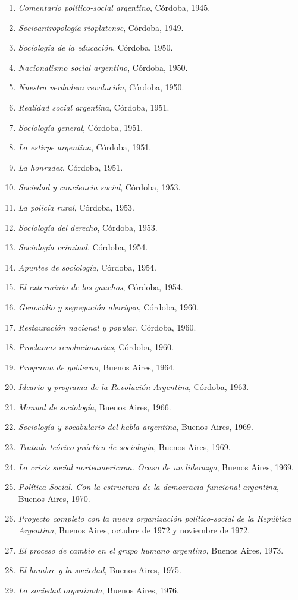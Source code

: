 \begin{enumerate}
\item \emph{Comentario político-social argentino}, Córdoba, 1945.
\item \emph{Socioantropología rioplatense}, Córdoba, 1949.
\item \emph{Sociología de la educación}, Córdoba, 1950.
\item \emph{Nacionalismo social argentino}, Córdoba, 1950.
\item \emph{Nuestra verdadera revolución}, Córdoba, 1950.
\item \emph{Realidad social argentina}, Córdoba, 1951.
\item \emph{Sociología general}, Córdoba, 1951.
\item \emph{La estirpe argentina}, Córdoba, 1951.
\item \emph{La honradez}, Córdoba, 1951.
\item \emph{Sociedad y conciencia social}, Córdoba, 1953.
\item \emph{La policía rural}, Córdoba, 1953.
\item \emph{Sociología del derecho}, Córdoba, 1953.
\item \emph{Sociología criminal}, Córdoba, 1954.
\item \emph{Apuntes de sociología}, Córdoba, 1954.
\item \emph{El exterminio de los gauchos}, Córdoba, 1954.
\item \emph{Genocidio y segregación aborigen}, Córdoba, 1960.
\item \emph{Restauración nacional y popular}, Córdoba, 1960.
\item \emph{Proclamas revolucionarias}, Córdoba, 1960.
\item \emph{Programa de gobierno}, Buenos Aires, 1964.
\item \emph{Ideario y programa de la Revolución Argentina}, Córdoba, 1963.
\item \emph{Manual de sociología}, Buenos Aires, 1966.
\item \emph{Sociología y vocabulario del habla argentina}, Buenos Aires, 1969.
\item \emph{Tratado teórico-práctico de sociología}, Buenos Aires, 1969.
\item \emph{La crisis social norteamericana. Ocaso de un liderazgo}, Buenos Aires, 1969.
\item \emph{Política Social. Con la estructura de la democracia funcional argentina}, Buenos Aires, 1970.
\item \emph{Proyecto completo con la nueva organización político-social de la República Argentina}, Buenos Aires, octubre de 1972 y noviembre de 1972.
\item \emph{El proceso de cambio en el grupo humano argentino}, Buenos Aires, 1973.
\item \emph{El hombre y la sociedad}, Buenos Aires, 1975.
\item \emph{La sociedad organizada}, Buenos Aires, 1976.
\end{enumerate}

